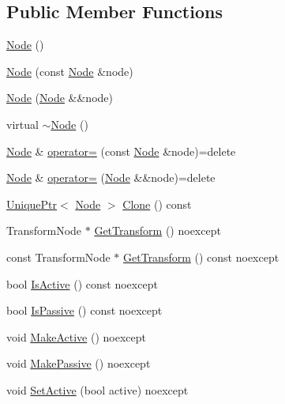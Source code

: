 \subsection*{Public Member Functions}
\begin{DoxyCompactItemize}
\item 
\hyperlink{classmage_1_1_node_a58b816eaa1dfd3c4b7f14896f190587f}{Node} ()
\item 
\hyperlink{classmage_1_1_node_af9da591163469f210895f3a5b389d7cc}{Node} (const \hyperlink{classmage_1_1_node}{Node} \&node)
\item 
\hyperlink{classmage_1_1_node_adbc40b6c4100f74faa2b59a7a0b79388}{Node} (\hyperlink{classmage_1_1_node}{Node} \&\&node)
\item 
virtual \hyperlink{classmage_1_1_node_a1369fc11b331abacbaf11aeb5729e871}{$\sim$\+Node} ()
\item 
\hyperlink{classmage_1_1_node}{Node} \& \hyperlink{classmage_1_1_node_ad10ea13608963acfa06d3c1577314da5}{operator=} (const \hyperlink{classmage_1_1_node}{Node} \&node)=delete
\item 
\hyperlink{classmage_1_1_node}{Node} \& \hyperlink{classmage_1_1_node_a007043de35c65edb9a0d790824186151}{operator=} (\hyperlink{classmage_1_1_node}{Node} \&\&node)=delete
\item 
\hyperlink{namespacemage_a3316d7143a973e37adf1110f2e80ca31}{Unique\+Ptr}$<$ \hyperlink{classmage_1_1_node}{Node} $>$ \hyperlink{classmage_1_1_node_a18e08151571435d319be2414474c93c0}{Clone} () const
\item 
Transform\+Node $\ast$ \hyperlink{classmage_1_1_node_ab789d7674ed06d3e10114dd6d4b4334c}{Get\+Transform} () noexcept
\item 
const Transform\+Node $\ast$ \hyperlink{classmage_1_1_node_acbffccfec34313d8583546204c3d9fda}{Get\+Transform} () const noexcept
\item 
bool \hyperlink{classmage_1_1_node_a6fce6afdcfdde0e5dff5b219cee4f372}{Is\+Active} () const noexcept
\item 
bool \hyperlink{classmage_1_1_node_a5fb6ac39c7e0d630944594cd5426f61a}{Is\+Passive} () const noexcept
\item 
void \hyperlink{classmage_1_1_node_a3945ebd27cbb587d3fd0140df55eb4fb}{Make\+Active} () noexcept
\item 
void \hyperlink{classmage_1_1_node_aee4af2ccc576c422643d478ffafce5c4}{Make\+Passive} () noexcept
\item 
void \hyperlink{classmage_1_1_node_af123050daa89e50f5468b630061aae53}{Set\+Active} (bool active) noexcept

\end{DoxyCompactItemize}
